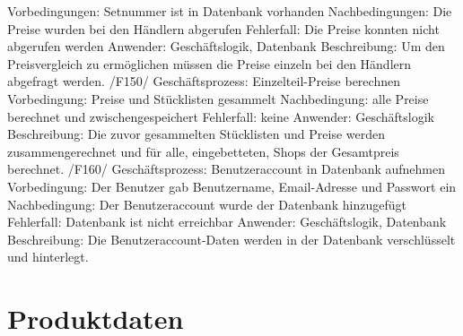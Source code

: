 Vorbedingungen: Setnummer ist in Datenbank vorhanden \newline
Nachbedingungen: Die Preise wurden bei den Händlern abgerufen \newline
Fehlerfall: Die Preise konnten nicht abgerufen werden \newline
Anwender: Geschäftslogik, Datenbank \newline
Beschreibung: Um den Preisvergleich zu ermöglichen müssen die Preise einzeln bei den Händlern abgefragt werden. \newline \newline
/F150/ \newline
Geschäftsprozess: Einzelteil-Preise berechnen \newline
Vorbedingung: Preise und Stücklisten gesammelt \newline
Nachbedingung: alle Preise berechnet und zwischengespeichert\newline
Fehlerfall: keine \newline
Anwender: Geschäftslogik \newline
Beschreibung: Die zuvor gesammelten Stücklisten und Preise werden zusammengerechnet und für alle, eingebetteten, Shops der Gesamtpreis berechnet. \newline \newline
/F160/ \newline
Geschäftsprozess: Benutzeraccount in Datenbank aufnehmen \newline
Vorbedingung: Der Benutzer gab Benutzername, Email-Adresse und Passwort ein \newline
Nachbedingung: Der Benutzeraccount wurde der Datenbank hinzugefügt \newline
Fehlerfall: Datenbank ist nicht erreichbar \newline
Anwender: Geschäftslogik, Datenbank \newline
Beschreibung: Die Benutzeraccount-Daten werden in der Datenbank verschlüsselt und hinterlegt.
\newline \newline

\section{Produktdaten}
